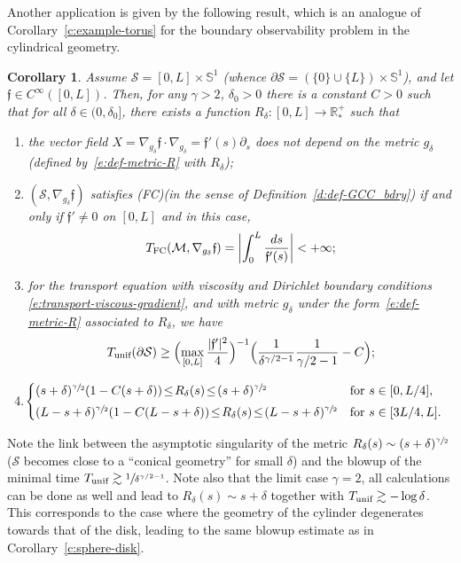 \documentclass[JEP,XML,SOM,Unicode]{cedram}
\newcommand{\FC}{\textup{FC}}
\newcommand{\pFC}{\textup{(FC)}\xspace}
\newcommand{\unif}{\textup{unif}}
\newtheorem{corollary}[lemma]{Corollary}
\theoremstyle{definition}
\newcommand{\M}{\ensuremath{\mathcal M}}
\newcommand{\calS}{\ensuremath{\mathcal S}}
\newcommand{\mb}[1]{\ensuremath{\mathbb{#1}}}
\newcommand{\R}{{\mb{R}}}
\newcommand{\bS}{\ensuremath{\mathbb S}}
\newcommand{\f}{\ensuremath{\mathfrak{f}}}
\let\d\partial
\begin{document}
\pagebreak[2]
Another application is given by the following result, which is an analogue of Corollary~\ref{c:example-torus} for the boundary observability problem in the cylindrical geometry.
\begin{corollary}
\label{c:example-cylinder}
Assume $\calS=[0,L]\times\bS^1$ (whence $\d\calS = (\{0\}\cup\{L\})\times\bS^1$), and let $\f\in C^{\infty}([0,L])$. Then, for any $\gamma >2$, $\delta_0>0$ there is a constant $C>0$ such that for all $\delta \in (0,\delta_0]$, there exists a function $R_\delta: [0,L]\to\R^+_*$ such that
\begin{enumerate}
\item the vector field $X= \nabla_{g_\delta}\f \cdot \nabla_{g_\delta} = \f'(s) \d_s$ does not depend on the metric $g_\delta$ (defined by~\eqref{e:def-metric-R} with $R_\delta$);
\item $(\calS,\nabla_{g_\delta}\f)$ satisfies \pFC (in the sense of Definition~\ref{d:def-GCC_bdry}) if and only if $\f' \neq 0$ on $[0,L]$ and in this case,
\[
T_{\FC}(\M,\nabla_{g_\delta}\f) = \biggl| \int_0^L \frac{ds}{\f'(s)} \biggr| <+\infty ;
\]
\item for the transport equation with viscosity and Dirichlet boundary conditions \eqref{e:transport-viscous-gradient}, and with metric $g_\delta$ under the form~\eqref{e:def-metric-R} associated to $R_\delta$, we have
\[
T_{\unif}(\d\calS) \geq \Bigl(\max_{[0,L]}\frac{|\f'|^2}{4} \Bigr)^{-1} \Bigl( \frac{1}{\delta^{\gamma/2-1}}\frac{1}{\gamma/2-1} - C \Bigr);
\]
\item \label{itemdelta}
$\hspace*{-1mm}\begin{cases}
(s+\delta)^{\sfrac{\gamma}{2}} (1-C (s+\delta)) \!\leq\! R_\delta(s) \!\leq\! (s+\delta)^{\sfrac{\gamma}{2}}& \text{for }s\in [0,L/4],\\[3pt]
(L-s+\delta)^{\sfrac{\gamma}{2}} (1-C (L-s+\delta)) \!\leq\! R_\delta(s) \!\leq\! (L-s+\delta)^{\sfrac{\gamma}{2}}&\text{for }s\in [3L/4,L].
\end{cases}$
\end{enumerate}
\end{corollary}
Note the link between the asymptotic singularity of the metric $R_\delta(s) \sim (s+\delta)^{\sfrac{\gamma}{2}}$ (\ie $\calS$ becomes close to a ``conical geometry'' for small $\delta$) and the blowup of the minimal time $T_{\unif} \gtrsim\sfrac{1}{\delta^{\gamma/2-1}}$. Note also that the limit case $\gamma =2$, all calculations can be done as well and lead to $R_\delta(s) \sim s+\delta$ together with $T_{\unif}\gtrsim -\log \delta$. This corresponds to the case where the geometry of the cylinder degenerates towards that of the disk, leading to the same blowup estimate as in Corollary~\ref{c:sphere-disk}.
\end{document}
